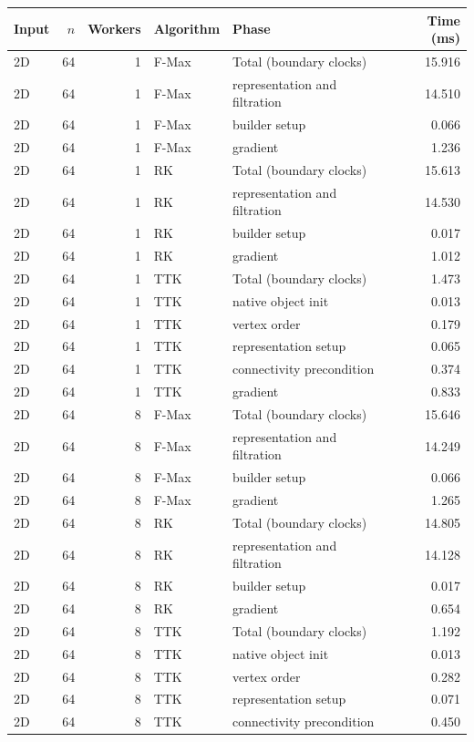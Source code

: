 \begin{tabular}{lrrllr}
\hline
Input & $n$ & Workers & Algorithm & Phase & Time (ms) \\
\hline
2D & 64 & 1 & F-Max & Total (boundary clocks) & 15.916 \\
2D & 64 & 1 & F-Max & representation and filtration & 14.510 \\
2D & 64 & 1 & F-Max & builder setup & 0.066 \\
2D & 64 & 1 & F-Max & gradient & 1.236 \\
2D & 64 & 1 & RK & Total (boundary clocks) & 15.613 \\
2D & 64 & 1 & RK & representation and filtration & 14.530 \\
2D & 64 & 1 & RK & builder setup & 0.017 \\
2D & 64 & 1 & RK & gradient & 1.012 \\
2D & 64 & 1 & TTK & Total (boundary clocks) & 1.473 \\
2D & 64 & 1 & TTK & native object init & 0.013 \\
2D & 64 & 1 & TTK & vertex order & 0.179 \\
2D & 64 & 1 & TTK & representation setup & 0.065 \\
2D & 64 & 1 & TTK & connectivity precondition & 0.374 \\
2D & 64 & 1 & TTK & gradient & 0.833 \\
2D & 64 & 8 & F-Max & Total (boundary clocks) & 15.646 \\
2D & 64 & 8 & F-Max & representation and filtration & 14.249 \\
2D & 64 & 8 & F-Max & builder setup & 0.066 \\
2D & 64 & 8 & F-Max & gradient & 1.265 \\
2D & 64 & 8 & RK & Total (boundary clocks) & 14.805 \\
2D & 64 & 8 & RK & representation and filtration & 14.128 \\
2D & 64 & 8 & RK & builder setup & 0.017 \\
2D & 64 & 8 & RK & gradient & 0.654 \\
2D & 64 & 8 & TTK & Total (boundary clocks) & 1.192 \\
2D & 64 & 8 & TTK & native object init & 0.013 \\
2D & 64 & 8 & TTK & vertex order & 0.282 \\
2D & 64 & 8 & TTK & representation setup & 0.071 \\
2D & 64 & 8 & TTK & connectivity precondition & 0.450 \\

\end{tabular}
